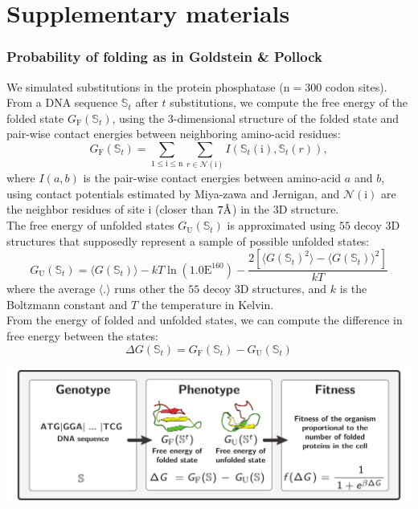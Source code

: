 \documentclass{article}
\newcommand{\angstrom}{\text{\normalfont\AA}}
\newcommand{\Nsite}{\text{n}}
\newcommand{\site}{\text{i}}
\newcommand{\ci}{\mathbb{S}_{t}}
\newcommand{\phenoFold}{\Delta G}
\begin{document}



\newpage
\part*{Supplementary materials}

\section*{Probability of folding as in Goldstein \& Pollock}
We simulated substitutions in the protein phosphatase ($\Nsite=300$ codon sites).
From a DNA sequence $\ci$ after $t$ substitutions, we compute the free energy of the folded state $G_{\mathrm{F}}\left(\ci\right)$, using the $3$-dimensional structure of the folded state and pair-wise contact energies between neighboring amino-acid residues:
\begin{equation}
G_{\mathrm{F}}\left(\ci\right) = \sum_{1 \leq \site \leq \Nsite} \sum_{r \in \mathcal{N}(\site)} I \left(\ci(\site), \ci(r) \right),
\end{equation}
where $I(a,b)$ is the pair-wise contact energies between amino-acid $a$ and $b$, using contact potentials estimated by Miya-zawa and Jernigan, and $\mathcal{N}(\site)$ are the neighbor residues of site $\site$ (closer than $7\angstrom$) in the $3$D structure.\\

The free energy of unfolded states $G_{\mathrm{U}}\left(\ci\right)$ is approximated using $55$ decoy $3$D structures that supposedly represent a sample of possible unfolded states:
\begin{equation}
G_{\mathrm{U}}\left(\ci\right) = \langle G\left(\ci\right) \rangle - kT \ln (1.0\mathrm{E}^{160}) - \dfrac{2 \left[ \langle G\left(\ci\right)^2 \rangle - \langle G\left(\ci\right) \rangle^2\right] }{kT}
\end{equation}
where the average $\langle . \rangle$ runs other the $55$ decoy $3$D structures, and $k$ is the Boltzmann constant and $T$ the temperature in Kelvin.\\

From the energy of folded and unfolded states, we can compute the difference in free energy between the states:
\begin{equation}
\phenoFold\left(\ci\right) = G_{\mathrm{F}}\left(\ci\right) - G_{\mathrm{U}}\left(\ci\right)
\end{equation}

\begin{center}
	\includegraphics[width=165mm] {artworks/ModelSimuFold.pdf}
\end{center}
\end{document}
